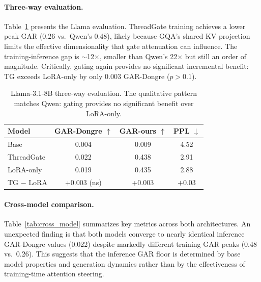 \documentclass[11pt,a4paper]{article}
\begin{document}
\paragraph{Three-way evaluation.} Table~\ref{tab:llama_eval} presents the Llama evaluation. ThreadGate training achieves a lower peak GAR (0.26 vs.\ Qwen's 0.48), likely because GQA's shared KV projection limits the effective dimensionality that gate attenuation can influence. The training-inference gap is $\sim$12$\times$, smaller than Qwen's 22$\times$ but still an order of magnitude. Critically, gating again provides no significant incremental benefit: TG exceeds LoRA-only by only 0.003 GAR-Dongre ($p > 0.1$).

\begin{table}[t]
\centering
\caption{Llama-3.1-8B three-way evaluation. The qualitative pattern matches Qwen: gating provides no significant benefit over LoRA-only.}
\label{tab:llama_eval}
\small
\begin{tabular}{lccc}
\toprule
\textbf{Model} & \textbf{GAR-Dongre} $\uparrow$ & \textbf{GAR-ours} $\uparrow$ & \textbf{PPL} $\downarrow$ \\
\midrule
Base & 0.004 & 0.009 & 4.52 \\
ThreadGate & 0.022 & 0.438 & 2.91 \\
LoRA-only & 0.019 & 0.435 & 2.88 \\
\midrule
TG $-$ LoRA & +0.003 (ns) & +0.003 & $+$0.03 \\
\bottomrule
\end{tabular}
\end{table}

\paragraph{Cross-model comparison.} Table~\ref{tab:cross_model} summarizes key metrics across both architectures. An unexpected finding is that both models converge to nearly identical inference GAR-Dongre values (0.022) despite markedly different training GAR peaks (0.48 vs.\ 0.26). This suggests that the inference GAR floor is determined by base model properties and generation dynamics rather than by the effectiveness of training-time attention steering.
\end{document}
